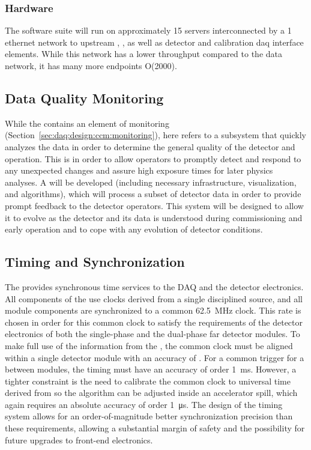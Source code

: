 \subsubsection{Hardware}
\label{sec:daq:design:ccm:hardware}

The  software suite will run on approximately 15 servers interconnected by a \SI{1}{\Gbps} ethernet network to upstream , ,  as well as detector and calibration daq interface elements. While this network has a lower throughput compared to the data network, it has many more endpoints O(2000).

\subsection{Data Quality Monitoring}
\label{sec:daq:design-data-quality}

While the  contains an element of monitoring (Section~\ref{sec:daq:design:ccm:monitoring}), here  refers to a subsystem that quickly analyzes the data in order to determine the general quality of the detector and  operation.
This is in order to allow operators to promptly detect and respond to any unexpected changes and assure high exposure times for later physics analyses. 
A   
will be developed (including necessary infrastructure, visualization,
and algorithms), which will process a subset of detector data in order
to provide prompt feedback to the detector operators. 
This system will be designed to allow it to evolve as the detector and its data is understood during commissioning and early operation and to cope with any evolution of detector conditions.


\subsection{Timing and Synchronization}
\label{sec:daq:design-timing}

The  provides synchronous time services to the DAQ and the detector electronics.
All components of the  use clocks derived from a single
 disciplined source, and all module components are
synchronized to a common \SI{62.5}{MHz} clock.
%
This rate is chosen in order for this common clock to satisfy the requirements of the detector electronics of both the single-phase and the dual-phase far detector modules.
%
To make full use of the information from the , the common clock must be aligned within a single detector 
module with an accuracy of . 
For a common trigger for a  between modules, the timing must have an accuracy of order \SI{1}{\milli\second}.
However, a tighter constraint is the need to calibrate the common clock to universal time derived from  so the  algorithm can be adjusted inside an accelerator spill, which again requires an absolute accuracy of order \SI{1}{\micro\second}. The design of the timing system allows for an order-of-magnitude better synchronization precision than these requirements, allowing a substantial margin of safety and the possibility for future upgrades to front-end electronics.


